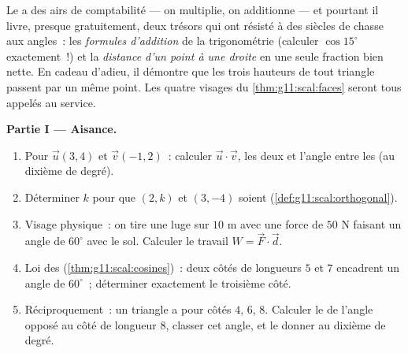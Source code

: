 \begin{problem}
\label{pb:g11:scal:1}
Le  a des airs de comptabilité --- on multiplie, on
additionne --- et pourtant il livre, presque gratuitement, deux
trésors qui ont résisté à des siècles de chasse aux angles~: les
\emph{formules d'addition} de la trigonométrie (calculer
$\cos 15^\circ$ exactement~!) et la \emph{distance d'un point à une
droite} en une seule fraction bien nette. En cadeau d'adieu, il
démontre que les trois hauteurs de tout triangle passent par un même
point. Les quatre visages du \cref{thm:g11:scal:faces} seront tous
appelés au service.

\medskip
\noindent\textbf{Partie I --- Aisance.}
\begin{enumerate}
  \item Pour $\vec u(3, 4)$ et $\vec v(-1, 2)$~: calculer
        $\vec u \cdot \vec v$, les deux  et l'angle entre les
         (au dixième de degré).
  \item Déterminer $k$ pour que $(2, k)$ et $(3, -4)$ soient
         (\cref{def:g11:scal:orthogonal}).
  \item Visage physique~: on tire une luge sur $10$ m avec une force
        de $50$ N faisant un angle de $60^\circ$ avec le sol.
        Calculer le travail $W = \vec F \cdot \vec d$.
  \item Loi des  (\cref{thm:g11:scal:cosines})~: deux côtés
        de longueurs $5$ et $7$ encadrent un angle de $60^\circ$~;
        déterminer exactement le troisième côté.
  \item Réciproquement~: un triangle a pour côtés $4$, $6$, $8$.
        Calculer le  de l'angle opposé au côté de longueur
        $8$, classer cet angle, et le donner au dixième de degré.
\end{enumerate}


\end{problem}

